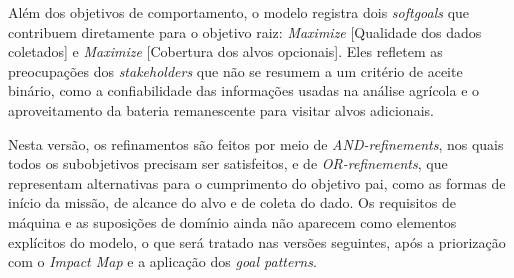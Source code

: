 \documentclass[a4paper, 12pt]{article}
\begin{document}
Além dos objetivos de comportamento, o modelo registra dois \textit{softgoals} que contribuem diretamente para o objetivo raiz: \textit{Maximize} [Qualidade dos dados coletados] e \textit{Maximize} [Cobertura dos alvos opcionais]. Eles refletem as preocupações dos \textit{stakeholders} que não se resumem a um critério de aceite binário, como a confiabilidade das informações usadas na análise agrícola e o aproveitamento da bateria remanescente para visitar alvos adicionais.

Nesta versão, os refinamentos são feitos por meio de \textit{AND-refinements}, nos quais todos os subobjetivos precisam ser satisfeitos, e de \textit{OR-refinements}, que representam alternativas para o cumprimento do objetivo pai, como as formas de início da missão, de alcance do alvo e de coleta do dado. Os requisitos de máquina e as suposições de domínio ainda não aparecem como elementos explícitos do modelo, o que será tratado nas versões seguintes, após a priorização com o \textit{Impact Map} e a aplicação dos \textit{goal patterns}.
\end{document}
